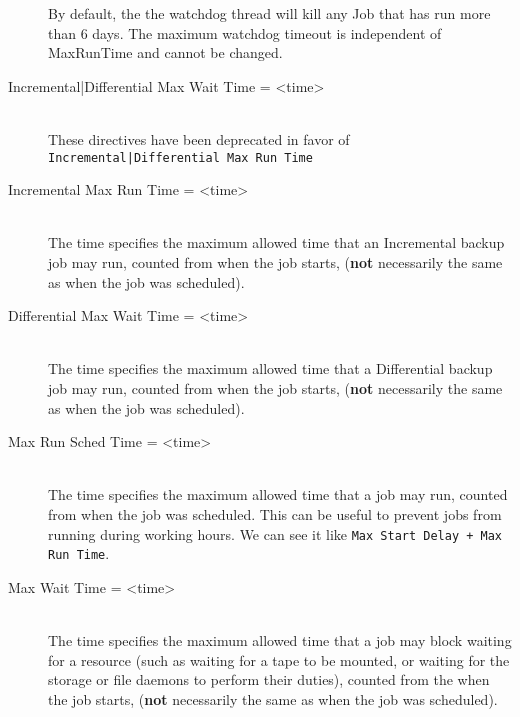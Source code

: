 \begin{description}
By default, the the watchdog thread will kill any Job that has run more
than 6 days.  The maximum watchdog timeout is independent of MaxRunTime
and cannot be changed.

\item [Incremental|Differential Max Wait Time = {\textless}time{\textgreater}] \hfill \\
These directives have been deprecated in favor of
\texttt{Incremental|Differential Max Run Time}

\item [Incremental Max Run Time = {\textless}time{\textgreater}] \hfill \\
The time specifies the maximum allowed time that an Incremental backup job may
run, counted from when the job starts, ({\bf not} necessarily the same as when
the job was scheduled).

\item [Differential Max Wait Time = {\textless}time{\textgreater}] \hfill \\
The time specifies the maximum allowed time that a Differential backup job may
run, counted from when the job starts, ({\bf not} necessarily the same as when
the job was scheduled).

\item [Max Run Sched Time = {\textless}time{\textgreater}] \hfill \\
The time specifies the maximum allowed time that a job may run, counted from
when the job was scheduled. This can be useful to prevent jobs from running
during working hours. We can see it like \texttt{Max Start Delay + Max Run
Time}.

\item [Max Wait Time = {\textless}time{\textgreater}] \hfill \\
The time specifies the maximum allowed time that a job may block waiting
for a resource (such as waiting for a tape to be mounted, or waiting for
the storage or file daemons to perform their duties), counted from the
when the job starts, ({\bf not} necessarily the same as when the job was
scheduled).


\end{description}

